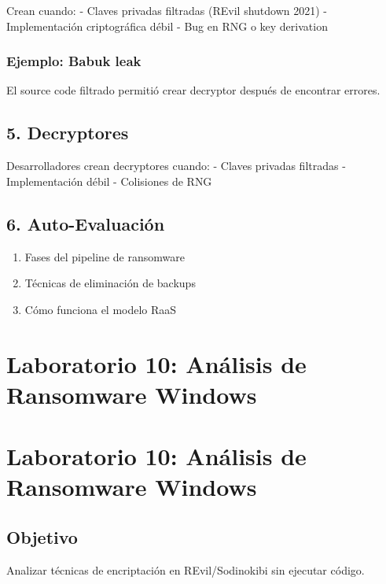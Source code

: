 \documentclass[
  letterpaper,
]{report}
\providecommand{\tightlist}{%
  \setlength{\itemsep}{0pt}\setlength{\parskip}{0pt}}
\begin{document}
Crean cuando: - Claves privadas filtradas (REvil shutdown 2021) -
Implementación criptográfica débil - Bug en RNG o key derivation

\subsection{Ejemplo: Babuk leak}\label{ejemplo-babuk-leak}

El source code filtrado permitió crear decryptor después de encontrar
errores.

\section{5. Decryptores}\label{decryptores-1}

Desarrolladores crean decryptores cuando: - Claves privadas filtradas -
Implementación débil - Colisiones de RNG

\section{6. Auto-Evaluación}\label{auto-evaluaciuxf3n-9}

\begin{enumerate}
\def\labelenumi{\arabic{enumi}.}
\tightlist
\item
  Fases del pipeline de ransomware
\item
  Técnicas de eliminación de backups
\item
  Cómo funciona el modelo RaaS
\end{enumerate}

\chapter{Laboratorio 10: Análisis de Ransomware
Windows}\label{laboratorio-10-anuxe1lisis-de-ransomware-windows}

\chapter{Laboratorio 10: Análisis de Ransomware
Windows}\label{laboratorio-10-anuxe1lisis-de-ransomware-windows-1}

\section{Objetivo}\label{objetivo-9}

Analizar técnicas de encriptación en REvil/Sodinokibi sin ejecutar
código.
\end{document}
